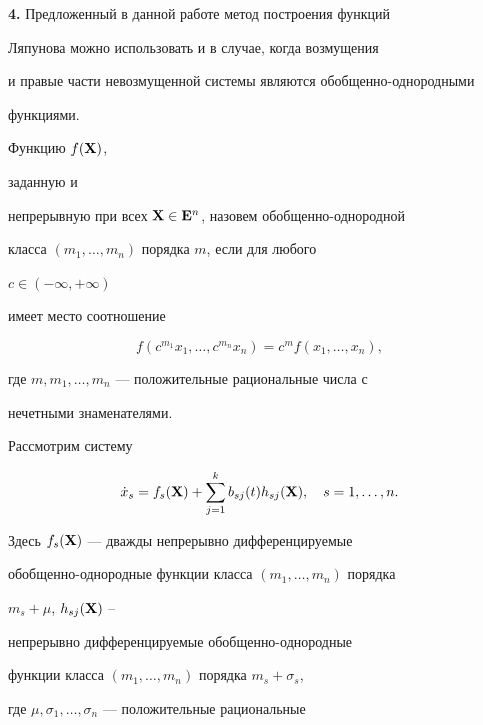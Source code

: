  


{\bf 4.} Предложенный в данной работе метод построения функций 


Ляпунова можно использовать и в случае, когда возмущения 


и правые части невозмущенной системы являются обобщенно-однородными 


функциями. 


 


\begin{defnnonum} 


Функцию $f(\bold X)$, 


заданную и 


непрерывную при всех $\bold X\in\bold E^n$, назовем обобщенно-однородной 


класса $(m_1,\dotsc,m_n)$ порядка $m$, если для любого 


$c\in(-\infty,+\infty)$ 


имеет место соотношение 


$$ 


f(c^{m_1}x_1,\dotsc,c^{m_n}x_n)=c^mf(x_1,\dotsc,x_n), 


$$ 


где $m,m_1,\dotsc,m_n$ --- положительные рациональные числа с 


нечетными знаменателями. 


\end{defnnonum}


 


Рассмотрим систему 


\begin{equation} 


\Dot x_s=f_s(\bx)+\sum^k_{j=1}b_{sj}(t)h_{sj}(\bx),\quad 


s=1,\dotsc,n. 


\end{equation} 


Здесь $f_s(\bold X)$ --- дважды непрерывно дифференцируемые 


обобщенно-однородные функции класса $(m_1,\dotsc,m_n)$ порядка 


$m_s+\mu$, $h_{sj}(\bold X)$ -- 


непрерывно дифференцируемые обобщенно-однородные 


функции класса $(m_1,\dotsc,m_n)$ порядка $m_s+\sigma_s$, 


где $\mu,\sigma_1,\dotsc,\sigma_n$ --- положительные рациональные 



